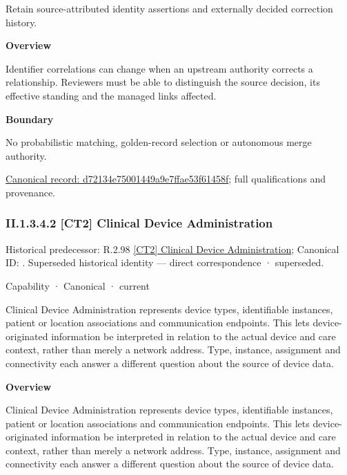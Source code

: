 Retain source-attributed identity assertions and externally decided correction history.



\textbf{Overview}



Identifier correlations can change when an upstream authority corrects a relationship. Reviewers must be able to distinguish the source decision, its effective standing and the managed links affected.



\textbf{Boundary}



No probabilistic matching, golden-record selection or autonomous merge authority.


{\footnotesize \href{../../../../../../../continuum/strategy/capability/feature/d72134e75001449a9e7ffae53f61458f.md}{Canonical record: d72134e75001449a9e7ffae53f61458f}; full qualifications and provenance.}\par
\subsubsection*{II.1.3.4.2 [CT2] Clinical Device Administration}
\label{navigation:II.1.3.4.2}

{\small Historical predecessor: R.2.98 \hyperref[element:3792be10541e4d68b3f740b1ba964966]{[CT2] Clinical Device Administration}; Canonical ID: \texttt{}. Superseded historical identity — direct correspondence · superseded.}\par
\label{element:31bcd6fda0d14cc8b992cdca39a3cbed}
{\small Capability · Canonical · current}\par

Clinical Device Administration represents device types, identifiable instances, patient or location associations and communication endpoints. This lets device-originated information be interpreted in relation to the actual device and care context, rather than merely a network address. Type, instance, assignment and connectivity each answer a different question about the source of device data.



\textbf{Overview}



Clinical Device Administration represents device types, identifiable instances, patient or location associations and communication endpoints. This lets device-originated information be interpreted in relation to the actual device and care context, rather than merely a network address. Type, instance, assignment and connectivity each answer a different question about the source of device data.



